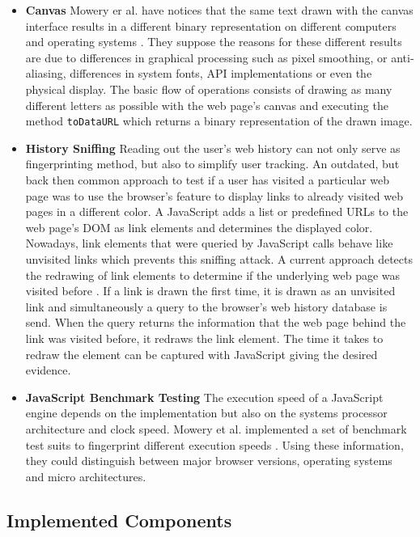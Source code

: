 \begin{itemize}
		\item \textbf{Canvas} Mowery er al. have notices that the same text drawn with the canvas interface results in a different binary representation on different computers and operating systems \cite{MS12}. They suppose the reasons for these different results are due to differences in graphical processing such as pixel smoothing, or anti-aliasing, differences in system fonts, API implementations or even the physical display. The basic flow of operations consists of drawing as many different letters as possible with the web page's canvas and executing the method \texttt{toDataURL} which returns a binary representation of the drawn image. 
		
		\item \textbf{History Sniffing} Reading out the user's web history can not only serve as fingerprinting method, but also to simplify user tracking. An outdated, but back then common approach to test if a user has visited a particular web page was to use the browser's feature to display links to already visited web pages in a different color. A JavaScript adds a list or predefined URLs to the web page's DOM as link elements and determines the displayed color. Nowadays, link elements that were queried by JavaScript calls behave like unvisited links which prevents this sniffing attack. A current approach detects the redrawing of link elements to determine if the underlying web page was visited before \cite{paulstone_historysniffing}. If a link is drawn the first time, it is drawn as an unvisited link and simultaneously a query to the browser's web history database is send. When the query returns the information that the web page behind the link was visited before, it redraws the link element. The time it takes to redraw the element can be captured with JavaScript giving the desired evidence.
		
		\item \textbf{JavaScript Benchmark Testing} The execution speed of a JavaScript engine depends on the implementation but also on the systems processor architecture and clock speed. Mowery et al. implemented a set of benchmark test suits to fingerprint different execution speeds \cite{MBYS11}. Using these information, they could distinguish between major browser versions, operating systems and micro architectures. 
	\end{itemize}	
 
\subsection{Implemented Components}
 
